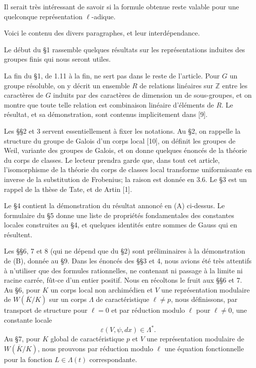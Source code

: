 \documentclass[10pt,letterpaper]{article}
\newcommand{\Z}{\mathbb Z}
\begin{document}
Il serait très intéressant de savoir si la formule obtenue reste valable pour une quelconque représentation \(\ell\)-adique.

Voici le contenu des divers paragraphes, et leur interdépendance.

Le début du §1 rassemble quelques résultats sur les représentations induites des groupes finis qui nous seront utiles.

La fin du §1, de 1.11 à la fin, ne sert pas dans le reste de l'article. Pour \(G\) un groupe résoluble, on y décrit un ensemble \(R\) de relations linéaires sur \(\Z\) entre les caractères de \(G\) induits par des caractères de dimension un de sous-groupes, et on montre que toute telle relation est combinaison linéaire d'éléments de \(R\). Le résultat, et sa démonstration, sont contenus implicitement dans [9].

Les §§2 et 3 servent essentiellement à fixer les notations. Au §2, on rappelle la structure du groupe de Galois d'un corps local [10], on définit les groupes de Weil, variante des groupes de Galois, et on donne quelques énoncés de la théorie du corps de classes. Le lecteur prendra garde que, dans tout cet article, l'isomorphisme de la théorie du corps de classes local transforme uniformisante en inverse de la substitution de Frobenius; la raison est donnée en 3.6. Le §3 est un rappel de la thèse de Tate, et de Artin [1].

Le §4 contient la démonstration du résultat annoncé en (A) ci-dessus. Le formulaire du §5 donne une liste de propriétés fondamentales des constantes locales construites au §4, et quelques identités entre sommes de Gauss qui en résultent.

Les §§6, 7 et 8 (qui ne dépend que du §2) sont préliminaires à la démonstration de (B), donnée au §9. Dans les énoncés des §§3 et 4, nous avions été très attentifs à n'utiliser que des formules rationnelles, ne contenant ni passage à la limite ni racine carrée, fût-ce d'un entier positif. Nous en récoltons le fruit aux §§6 et 7. Au §6, pour \(K\) un corps local non archimédien et \(V\) une représentation modulaire de \(W(\overline K/K)\) sur un corps \(\Lambda\) de caractéristique \(\ell\ne p\), nous définissons, par transport de structure pour \(\ell=0\) et par réduction modulo \(\ell\) pour \(\ell\ne0\), une constante locale
\[
\varepsilon(V,\psi,dx)\in \Lambda^*.
\]
Au §7, pour \(K\) global de caractéristique \(p\) et \(V\) une représentation modulaire de \(W(\overline K/K)\), nous prouvons par réduction modulo \(\ell\) une équation fonctionnelle pour la fonction \(L\in \Lambda(t)\) correspondante.
\end{document}

